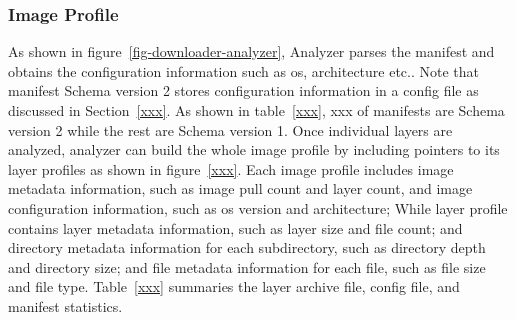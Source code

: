 




\subsubsection{Image Profile}

As shown in figure~\ref{fig-downloader-analyzer}, Analyzer parses the manifest and obtains the configuration information such as os, architecture etc..
%
Note that manifest Schema version 2 stores configuration information in a config file as discussed in Section~\ref{xxx}.
%
As shown in table~\ref{xxx}, xxx of manifests are Schema version 2 while the rest are Schema version 1. 
%
Once individual layers are analyzed, analyzer can build the whole image profile by including pointers to its layer profiles as shown in figure~\ref{xxx}. Each image profile includes image metadata information, such as image pull count and layer count, and image configuration information, such as os version and architecture; While layer profile contains layer metadata information, such as layer size and file count; and directory metadata information for each subdirectory, such as directory depth and directory size; and file metadata information for each file, such as file size and file type.
%
Table~\ref{xxx} summaries the layer archive file, config file, and manifest statistics.



